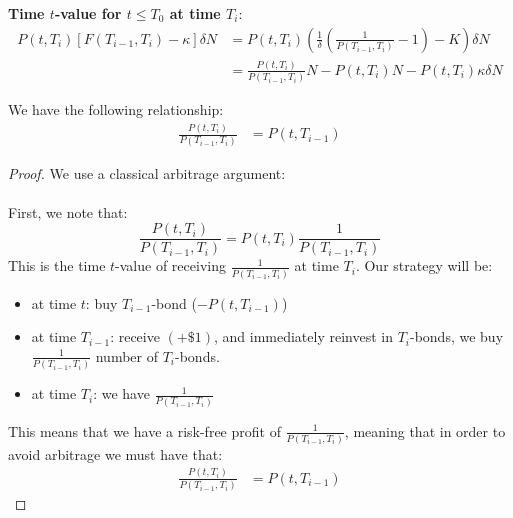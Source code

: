 \textbf{Time $t$-value for $t\leq T_{0}$ at time $T_{i}$}: 
\begin{align*}
P(t,T_{i})[F(T_{i-1}, T_{i}) - \kappa]\delta N
 &= 
 P(t,T_{i})
 \left(
 \frac{1}{\delta}\left(
 \frac{1}{P(T_{i-1}, T_{i})} - 1
 \right) - K
 \right)\delta N \\ 
 &= 
 \frac{P(t,T_{i})}{P(T_{i-1}, T_{i})}N - P(t,T_{i})N - P(t,T_{i})\kappa\delta N
\end{align*}

\newpage 

\begin{proposition}
\label{prop: ZCB_arbitrage_argument}
We have the following relationship:
\begin{align*}
\frac{P(t,T_{i})}{P(T_{i-1}, T_{i})} &= P(t,T_{i-1})   
\end{align*}
\end{proposition}

\begin{proof}
We use a classical arbitrage argument:
\\~\\ 
First, we note that:
$$
\frac{P(t,T_{i})}{P(T_{i-1}, T_{i})} = P(t,T_{i})\frac{1}{P(T_{i-1},T_{i})}
$$
This is the time $t$-value of receiving $\frac{1}{P(T_{i-1}, T_{i})}$ at time $T_{i}$. Our strategy will be:

\begin{itemize}[leftmargin=*]
    \item at time $t$: buy $T_{i-1}$-bond ($-P(t,T_{i-1})$)
    \item at time $T_{i-1}$: receive $(+\$ 1)$, and immediately reinvest in $T_{i}$-bonds, we buy $\frac{1}{P(T_{i-1}, T_{i})}$ number of $T_{i}$-bonds.
    \item at time $T_{i}$: we have $\frac{1}{P(T_{i-1}, T_{i})}$
\end{itemize}


 
This means that we have a risk-free profit of $\frac{1}{P(T_{i-1}, T_{i})}$, meaning that in order to avoid arbitrage we must have that:
\begin{align*}
\frac{P(t,T_{i})}{P(T_{i-1}, T_{i})} &= P(t,T_{i-1})   
\end{align*}
\end{proof}

